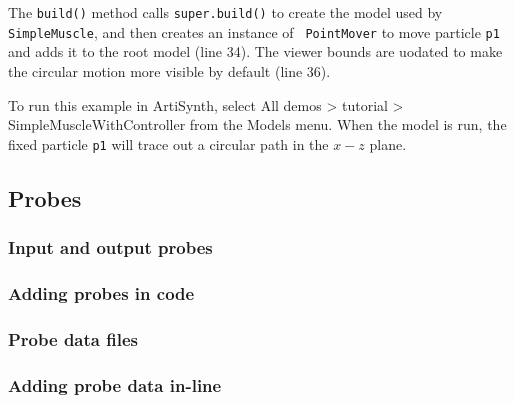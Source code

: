 The {\tt build()} method calls {\tt super.build()} to create the model
used by {\tt SimpleMuscle}, and then creates an instance of {\tt
PointMover} to move particle {\tt p1} and adds it to the root model
(line 34). The viewer bounds are uodated to make the circular motion
more visible by default (line 36).

To run this example in ArtiSynth, select {\sf All demos > tutorial >
SimpleMuscleWithController} from the {\sf Models} menu. When
the model is run, the fixed particle {\tt p1} will trace
out a circular path in the $x-z$ plane.

\subsection{Probes}
\label{Probes:sec}

\subsubsection{Input and output probes}

\subsubsection{Adding probes in code}


\subsubsection{Probe data files}

\subsubsection{Adding probe data in-line}
